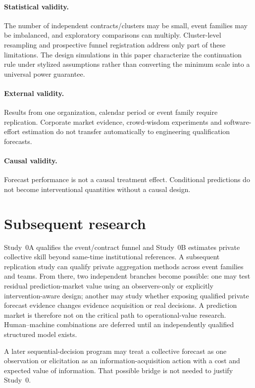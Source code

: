 \paragraph{Statistical validity.}
The number of independent contracts/clusters may be small, event families may be imbalanced, and exploratory comparisons can multiply. Cluster-level resampling and prospective funnel registration address only part of these limitations. The design simulations in this paper characterize the continuation rule under stylized assumptions rather than converting the minimum scale into a universal power guarantee.

\paragraph{External validity.}
Results from one organization, calendar period or event family require replication. Corporate market evidence, crowd-wisdom experiments and software-effort estimation do not transfer automatically to engineering qualification forecasts.

\paragraph{Causal validity.}
Forecast performance is not a causal treatment effect. Conditional predictions do not become interventional quantities without a causal design.

\section{Subsequent research}
Study~0A qualifies the event/contract funnel and Study~0B estimates private collective skill beyond same-time institutional references. A subsequent replication study can qualify private aggregation methods across event families and teams. From there, two independent branches become possible: one may test residual prediction-market value using an observers-only or explicitly intervention-aware design; another may study whether exposing qualified private forecast evidence changes evidence acquisition or real decisions. A prediction market is therefore not on the critical path to operational-value research. Human--machine combinations are deferred until an independently qualified structured model exists.

A later sequential-decision program may treat a collective forecast as one observation or elicitation as an information-acquisition action with a cost and expected value of information. That possible bridge is not needed to justify Study~0.

